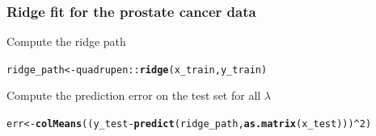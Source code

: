 \documentclass[10pt, c, xcolor=x11names]{beamer}\usepackage[]{graphicx}\usepackage[]{color}
\makeatletter
\newcommand{\hlnum}[1]{\textcolor[rgb]{0.686,0.059,0.569}{#1}}%
\newcommand{\hlopt}[1]{\textcolor[rgb]{0,0,0}{#1}}%
\newcommand{\hlstd}[1]{\textcolor[rgb]{0.345,0.345,0.345}{#1}}%
\newcommand{\hlkwb}[1]{\textcolor[rgb]{0.69,0.353,0.396}{#1}}%
\newcommand{\hlkwd}[1]{\textcolor[rgb]{0.737,0.353,0.396}{\textbf{#1}}}%
\newenvironment{kframe}{%
 \def\at@end@of@kframe{}%
 \ifinner\ifhmode%
  \def\at@end@of@kframe{\end{minipage}}%
  \begin{minipage}{\columnwidth}%
 \fi\fi%
 \def\FrameCommand##1{\hskip\@totalleftmargin \hskip-\fboxsep
 \colorbox{shadecolor}{##1}\hskip-\fboxsep
     \hskip-\linewidth \hskip-\@totalleftmargin \hskip\columnwidth}%
 \MakeFramed {\advance\hsize-\width
   \@totalleftmargin\z@ \linewidth\hsize
   \@setminipage}}%
 {\par\unskip\endMakeFramed%
 \at@end@of@kframe}
\newenvironment{knitrout}{}{} %
\makeatother
\begin{document}







\begin{frame}[containsverbatim]
  \frametitle{Ridge fit for the prostate cancer data}

  \vfill

Compute the ridge path
\begin{knitrout}\scriptsize
{}\color{fgcolor}\begin{kframe}
\begin{alltt}
\hlstd{ridge_path} \hlkwb{<-} \hlstd{quadrupen}\hlopt{::}\hlkwd{ridge}\hlstd{(x_train, y_train)}
\end{alltt}


{\ttfamily\noindent\bfseries\color{errorcolor}{\#\# Error: 'ridge' is not an exported object from 'namespace:quadrupen'}}\end{kframe}
\end{knitrout}

\vfill

Compute the prediction error on the test set for all $\lambda$
\begin{knitrout}\scriptsize
{}\color{fgcolor}\begin{kframe}
\begin{alltt}
\hlstd{err} \hlkwb{<-} \hlkwd{colMeans}\hlstd{((y_test} \hlopt{-} \hlkwd{predict}\hlstd{(ridge_path,} \hlkwd{as.matrix}\hlstd{(x_test)))}\hlopt{^}\hlnum{2}\hlstd{)}
\end{alltt}


{\ttfamily\noindent\bfseries\color{errorcolor}{\#\# Error in predict(ridge\_path, as.matrix(x\_test)): object 'ridge\_path' not found}}\end{kframe}
\end{knitrout}


\end{frame}
\end{document}
